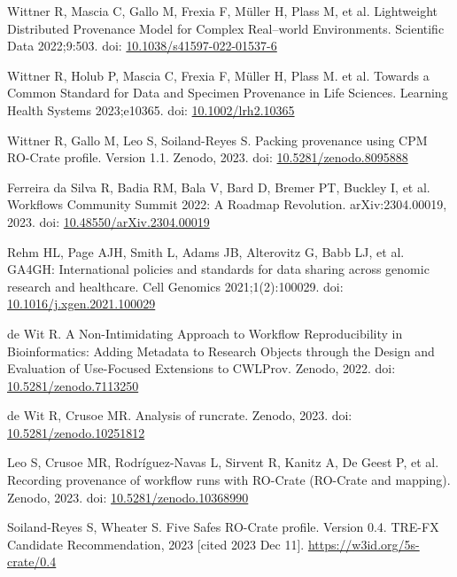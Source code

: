 \documentclass[10pt,letterpaper]{article}
\begin{document}
\begin{thebibliography}{10}
\begin{small}
Wittner R, Mascia C, Gallo M, Frexia F, Müller H, Plass M, et al.
Lightweight Distributed Provenance Model for Complex Real--world Environments.
Scientific Data 2022;9:503.
doi: \href{https://doi.org/10.1038/s41597-022-01537-6}{10.1038/s41597-022-01537-6}

Wittner R, Holub P, Mascia C, Frexia F, Müller H, Plass M. et al.
Towards a Common Standard for Data and Specimen Provenance in Life Sciences.
Learning Health Systems 2023;e10365.
doi: \href{https://doi.org/10.1002/lrh2.10365}{10.1002/lrh2.10365}

Wittner R, Gallo M, Leo S, Soiland-Reyes S.
Packing provenance using CPM RO-Crate profile. Version 1.1.
Zenodo, 2023.
doi: \href{https://doi.org/10.5281/zenodo.8095888}{10.5281/zenodo.8095888}

Ferreira da Silva R, Badia RM, Bala V, Bard D, Bremer PT, Buckley I, et al.
Workflows Community Summit 2022: A Roadmap Revolution.
arXiv:2304.00019, 2023.
doi: \href{https://doi.org/10.48550/arXiv.2304.00019}{10.48550/arXiv.2304.00019}

Rehm HL, Page AJH, Smith L, Adams JB, Alterovitz G, Babb LJ, et al.
GA4GH: International policies and standards for data sharing across genomic research and healthcare.
Cell Genomics 2021;1(2):100029.
doi: \href{https://doi.org/10.1016/j.xgen.2021.100029}{10.1016/j.xgen.2021.100029}

de Wit R.
A Non-Intimidating Approach to Workflow Reproducibility in Bioinformatics: Adding Metadata to Research Objects through the Design and Evaluation of Use-Focused Extensions to CWLProv.
Zenodo, 2022.
doi: \href{https://doi.org/10.5281/zenodo.7113250}{10.5281/zenodo.7113250}

de Wit R, Crusoe MR.
Analysis of runcrate.
Zenodo, 2023.
doi: \href{https://doi.org/10.5281/zenodo.10251812}{10.5281/zenodo.10251812}

Leo S, Crusoe MR, Rodríguez-Navas L, Sirvent R, Kanitz A, De Geest P, et al.
Recording provenance of workflow runs with RO-Crate (RO-Crate and mapping).
Zenodo, 2023.
doi: \href{https://doi.org/10.5281/zenodo.10368990}{10.5281/zenodo.10368990}

Soiland-Reyes S, Wheater S.
Five Safes RO-Crate profile. Version 0.4.
TRE-FX Candidate Recommendation, 2023 [cited 2023 Dec 11].
\url{https://w3id.org/5s-crate/0.4}


\end{small}
\end{thebibliography}
\end{document}

